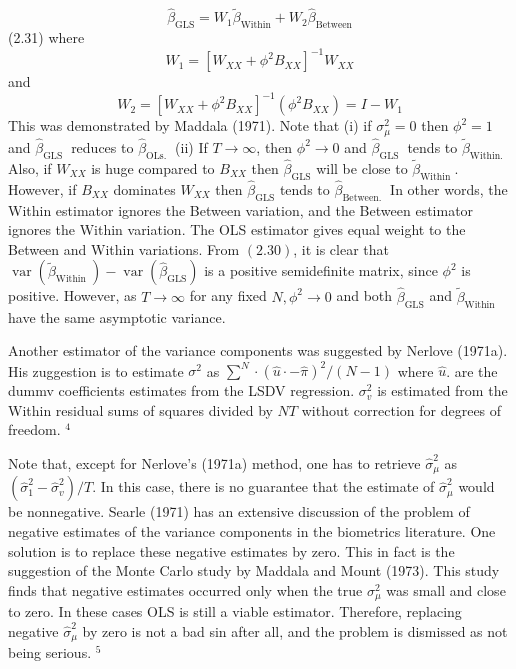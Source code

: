 \documentclass[
]{book}
\begin{document}
\begin{equation}
\widehat{\beta}_{\mathrm{GLS}}=W_{1} \widetilde{\beta}_{\mathrm{Within}}+W_{2} \widehat{\beta}_{\mathrm{Between}}
\end{equation} (2.31) where \[
W_{1}=\left[W_{X X}+\phi^{2} B_{X X}\right]^{-1} W_{X X}
\] and \[
W_{2}=\left[W_{X X}+\phi^{2} B_{X X}\right]^{-1}\left(\phi^{2} B_{X X}\right)=I-W_{1}
\] This was demonstrated by Maddala (1971). Note that (i) if \(\sigma_{\mu}^{2}=0\) then \(\phi^{2}=1\) and \(\widehat{\beta}_{\text {GLS }}\) reduces to \(\widehat{\beta}_{\text {OLs. }}\) (ii) If \(T \rightarrow \infty\), then \(\phi^{2} \rightarrow 0\) and \(\widehat{\beta}_{\text {GLS }}\) tends to \(\widetilde{\beta}_{\text {Within. }}\) Also, if \(W_{X X}\) is huge compared to \(B_{X X}\) then \(\widehat{\beta}_{\mathrm{GLS}}\) will be close to \(\widetilde{\beta}_{\text {Within }}\). However, if \(B_{X X}\) dominates \(W_{X X}\) then \(\widehat{\beta}_{\mathrm{GLS}}\) tends to \(\widehat{\beta}_{\text {Between. }}\) In other words, the Within estimator ignores the Between variation, and the Between estimator ignores the Within variation. The OLS estimator gives equal weight to the Between and Within variations. From \((2.30)\), it is clear that \(\operatorname{var}\left(\widetilde{\beta}_{\text {Within }}\right)-\operatorname{var}\left(\hat{\beta}_{\mathrm{GLS}}\right)\) is a positive semidefinite matrix, since \(\phi^{2}\) is positive. However, as \(T \rightarrow \infty\) for any fixed \(N, \phi^{2} \rightarrow 0\) and both \(\widehat{\beta}_{\mathrm{GLS}}\) and \(\widetilde{\beta}_{\text {Within }}\) have the same asymptotic variance.

Another estimator of the variance components was suggested by Nerlove (1971a). His zuggestion is to estimate \(\sigma^{2}\) as \(\sum^{N} \cdot(\widehat{u} \cdot-\widehat{\pi})^{2} /(N-1)\) where \(\widehat{u}\). are the dummv coefficients estimates from the LSDV regression. \(\sigma_{v}^{2}\) is estimated from the Within residual sums of squares divided by \(N T\) without correction for degrees of freedom. \({ }^{4}\)

Note that, except for Nerlove's (1971a) method, one has to retrieve \(\widehat{\sigma}_{\mu}^{2}\) as \(\left(\widehat{\sigma}_{1}^{2}-\widehat{\sigma}_{v}^{2}\right) / T .\) In this case, there is no guarantee that the estimate of \(\widehat{\sigma}_{\mu}^{2}\) would be nonnegative. Searle (1971) has an extensive discussion of the problem of negative estimates of the variance components in the biometrics literature. One solution is to replace these negative estimates by zero. This in fact is the suggestion of the Monte Carlo study by Maddala and Mount (1973). This study finds that negative estimates occurred only when the true \(\sigma_{\mu}^{2}\) was small and close to zero. In these cases OLS is still a viable estimator. Therefore, replacing negative \(\widehat{\sigma}_{\mu}^{2}\) by zero is not a bad sin after all, and the problem is dismissed as not being serious. \({ }^{5}\)
\end{document}
